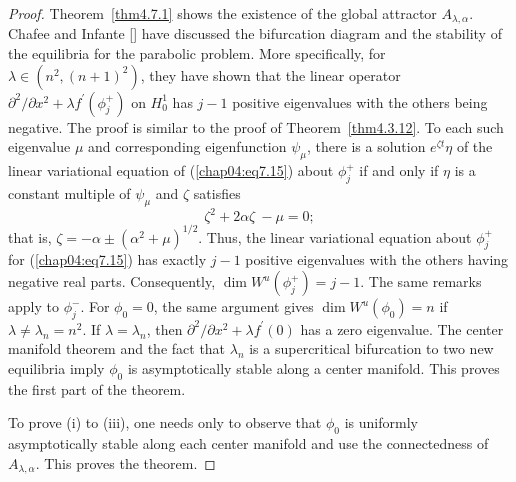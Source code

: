 \documentclass{surv-l}
\theoremstyle{plain}
\theoremstyle{definition}
\numberwithin{equation}{section}
\numberwithin{figure}{chapter}
\begin{document}
\begin{proof}
Theorem~\ref{thm4.7.1} shows the existence of the global attractor $A_{\lambda,\alpha}.$ Chafee and Infante [\citeyear{1974ci}] have discussed the bifurcation diagram and the stability of the equilibria for the parabolic problem. More specifically, for $\lambda\in (n^{2}, (n+1)^{2})$, they have shown that the linear operator $\partial^{2}/\partial x^{2}+\lambda f^{\prime}(\phi_{j}^{+})$ on $H_{0}^{1}$ has $j-1$ positive eigenvalues with the others being negative. The proof is similar to the proof of Theorem~\ref{thm4.3.12}. To each such eigenvalue $\mu$ and corresponding eigenfunction $\psi_{\mu}$, there is a solution $ e^{\zeta t}\eta$ of the linear variational equation of (\ref{chap04:eq7.15}) about $\phi_{j}^{+}$ if and only if $\eta$ is a constant multiple of $\psi_{\mu}$ and $\zeta$ satisfies
\begin{equation*}
\zeta^{2}+2\alpha\zeta\ -\mu=0;
\end{equation*}
that is, $\zeta=-\alpha\pm(\alpha^{2}+\mu)^{1/2}$. Thus, the linear variational equation about $\phi_{j}^{+}$ for (\ref{chap04:eq7.15}) has exactly $j-1$ positive eigenvalues with the others having negative real parts. Consequently, $\dim W^{u}(\phi_{j}^{+})=j-1$. The same remarks apply to $\phi_{j}^{-}$. For $\phi_{0}=0$, the same argument gives $\dim W^{u}(\phi_{0})=n$ if $\lambda \neq\lambda_{n}=n^{2}$. If $\lambda =\lambda_{n}$, then $\partial^{2}/\partial x^{2}+\lambda f^{\prime}(0)$ has a zero eigenvalue. The center manifold theorem and the fact that $\lambda_{n}$ is a supercritical bifurcation to two new equilibria imply $\phi_{0}$ is asymptotically stable along a center manifold. This proves the first part of the theorem.

To prove (i) to (iii), one needs only to observe that $\phi_{0}$ is uniformly asymptotically stable along each center manifold and use the connectedness of $A_{\lambda,\alpha}$. This proves the theorem.
\end{proof}
\end{document}
